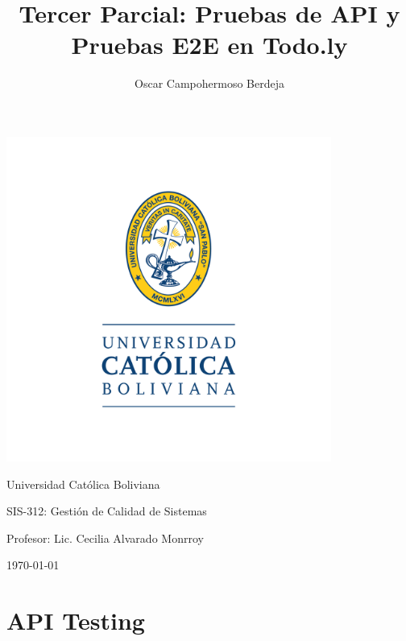 \documentclass{report}
\title{Tercer Parcial: Pruebas de API y Pruebas E2E en Todo.ly}
\author{Oscar Campohermoso Berdeja}
\newcommand{\affiliation}{Universidad Católica Boliviana}
\newcommand{\course}{SIS-312: Gestión de Calidad de Sistemas}
\newcommand{\professor}{Lic. Cecilia Alvarado Monrroy}
\begin{document}
\begin{titlepage}
    \centering
    \includegraphics[width=0.8\textwidth]{./imgs/logo-ucb.png}\par
    {\Huge \textbf{\thetitle}\par}
    \vspace{0.5cm} %
    {\Large {\theauthor}\par}
    \vspace{0.5cm} %
    {\Large {\affiliation}\par}
    \vspace{0.5cm} %
    {\Large {\course}\par}
    \vspace{0.5cm} %
    {\Large {Profesor: \professor}\par}
    \vspace{0.5cm} %
    {\Large \today\par}
\end{titlepage}

\tableofcontents
\chapter{API Testing}
\end{document}
